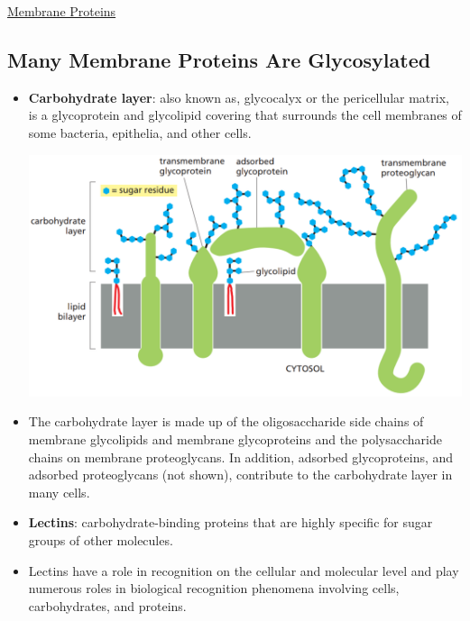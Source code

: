 \documentclass[12pt,letterpaper]{article}
\begin{document}
\begin{secbox}{\hyperlink{10}{Membrane Proteins}}
{    \hypertarget{10.11}{\subsection*{Many Membrane Proteins Are Glycosylated}}
    \begin{itemize}
        \item \textbf{Carbohydrate layer}: also known as, glycocalyx or the pericellular matrix, is a glycoprotein and glycolipid covering that surrounds the cell membranes of some bacteria, epithelia, and other cells.
        \begin{center}
            \includegraphics[scale=0.45]{images/figure_10_25.png}
        \end{center}
        \vspace{-20pt}
        \item The carbohydrate layer is made up of the oligosaccharide side chains of membrane glycolipids and membrane glycoproteins and the polysaccharide chains on membrane proteoglycans. In addition, adsorbed glycoproteins, and adsorbed proteoglycans (not shown), contribute to the carbohydrate layer in many cells.
        \item \textbf{Lectins}: carbohydrate-binding proteins that are highly specific for sugar groups of other molecules.\par 
        \item Lectins have a role in recognition on the cellular and molecular level and play numerous roles in biological recognition phenomena involving cells, carbohydrates, and proteins. 
    \end{itemize}

}
\end{secbox}
\end{document}
